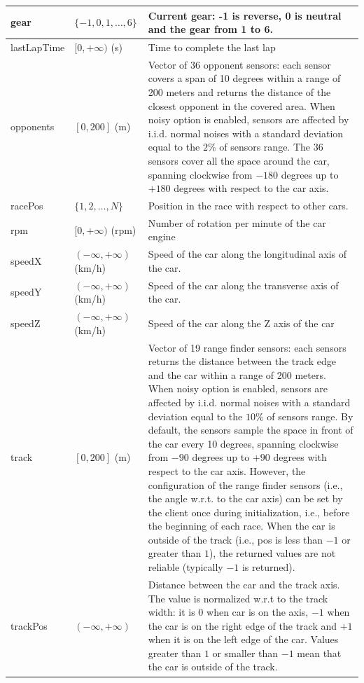 \documentclass[declaration,shortabstract,english,inz]{iithesis}
\begin{document}
\begin{center}
\begin{longtable}{ | p{} |p{}| p{} |}
     \hline
     gear & $ \{ -1,0,1, \dots, 6 \} $ & Current gear: -1 is reverse, 0 is neutral and the gear from 1 to 6. \\
     \hline
     lastLapTime & $[0, +\infty)$ (s) & Time to complete the last lap \\
     \hline
     opponents & $[0, 200]$ (m) & Vector of 36 opponent sensors: each sensor covers a span of 10 degrees within a range of 200 meters and returns the distance of the closest opponent in the covered area. When noisy option is enabled, sensors are affected by i.i.d. normal noises with a standard deviation equal to the $2\%$ of sensors range. The 36 sensors cover all the space around the car, spanning clockwise from $-180$ degrees up to $+180$ degrees with respect to the car axis. \\
     \hline
     racePos & $\{1,2,\dots,N\}$ & Position in the race with respect to other cars. \\
     \hline
     rpm & $[0, +\infty)$ (rpm) & Number of rotation per minute of the car engine \\
     \hline
     speedX & $ ( -\infty, +\infty ) $ (km/h) & Speed of the car along the longitudinal axis of the car. \\
     \hline
     speedY & $ ( -\infty, +\infty ) $ (km/h) & Speed of the car along the transverse axis of the car. \\
     \hline
     speedZ & $ ( -\infty, +\infty ) $ (km/h) & Speed of the car along the Z axis of the car \\
     \hline        
     track &  $[0, 200]$ (m) & Vector of 19 range finder sensors: each sensors returns the distance between the track edge and the car within a range of 200 meters. When noisy option is enabled, sensors are affected by i.i.d. normal noises with a standard deviation equal to the $10\%$ of sensors range. By default, the sensors sample the space in front of the car every 10 degrees, spanning clockwise from $-90$ degrees up to $+90$ degrees with respect to the car axis. However, the configuration of the range finder sensors (i.e., the angle w.r.t. to the car axis) can be set by the client once during initialization, i.e., before the beginning of each race. When the car is outside of the track (i.e., pos is less than $-1$ or greater than $1$), the returned values are not reliable (typically $-1$ is returned). \\
     \hline
     trackPos & $( -\infty, +\infty )$ & Distance between the car and the track axis. The value is normalized w.r.t to the track width: it is $0$ when car is on the axis, $-1$ when the car is on the right edge of the track and $+1$ when it is on the left edge of the car. Values greater than $1$ or smaller than $-1$ mean that the car is outside of the track. \\

\end{longtable}
\end{center}
\end{document}
